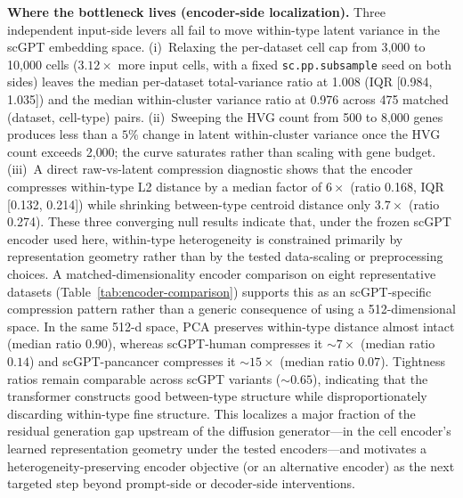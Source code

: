 \documentclass[11pt,a4paper]{article}
\begin{document}
\textbf{Where the bottleneck lives (encoder-side localization).} Three independent input-side levers all fail to move within-type latent variance in the scGPT embedding space. (i)~Relaxing the per-dataset cell cap from 3{,}000 to 10{,}000 cells ($3.12\times$ more input cells, with a fixed \texttt{sc.pp.subsample} seed on both sides) leaves the median per-dataset total-variance ratio at 1.008 (IQR [0.984, 1.035]) and the median within-cluster variance ratio at 0.976 across 475 matched (dataset, cell-type) pairs. (ii)~Sweeping the HVG count from 500 to 8{,}000 genes produces less than a $5\%$ change in latent within-cluster variance once the HVG count exceeds 2{,}000; the curve saturates rather than scaling with gene budget. (iii)~A direct raw-vs-latent compression diagnostic shows that the encoder compresses within-type L2 distance by a median factor of $6\times$ (ratio 0.168, IQR [0.132, 0.214]) while shrinking between-type centroid distance only $3.7\times$ (ratio 0.274). These three converging null results indicate that, under the frozen scGPT encoder used here, within-type heterogeneity is constrained primarily by representation geometry rather than by the tested data-scaling or preprocessing choices. A matched-dimensionality encoder comparison on eight representative datasets (Table~\ref{tab:encoder-comparison}) supports this as an scGPT-specific compression pattern rather than a generic consequence of using a 512-dimensional space. In the same 512-d space, PCA preserves within-type distance almost intact (median ratio $0.90$), whereas scGPT-human compresses it $\sim 7\times$ (median ratio $0.14$) and scGPT-pancancer compresses it $\sim 15\times$ (median ratio $0.07$). Tightness ratios remain comparable across scGPT variants ($\sim 0.65$), indicating that the transformer constructs good between-type structure while disproportionately discarding within-type fine structure. This localizes a major fraction of the residual generation gap upstream of the diffusion generator---in the cell encoder's learned representation geometry under the tested encoders---and motivates a heterogeneity-preserving encoder objective (or an alternative encoder) as the next targeted step beyond prompt-side or decoder-side interventions.
\end{document}
